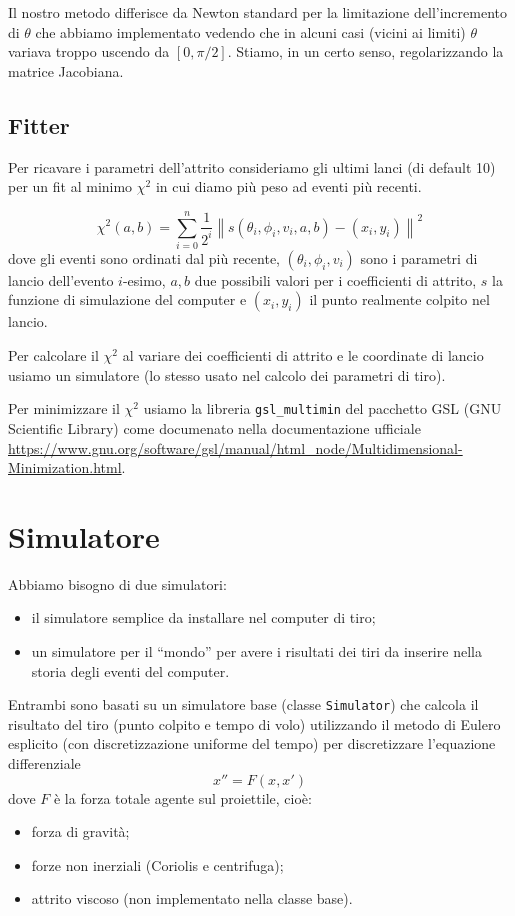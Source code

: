 \documentclass[a4paper,10pt]{article}
\newcommand{\pa}[1]{\left(#1\right)}
\newcommand{\bra}[1]{\left[#1\right]}
\newcommand{\norm}[1]{\left\|#1\right\|}
\begin{document}
Il nostro metodo differisce da Newton standard per la limitazione
dell'incremento di $\theta$ che abbiamo implementato vedendo che in
alcuni casi (vicini ai limiti) $\theta$ variava troppo uscendo da
$\bra{0,\pi/2}$. Stiamo, in un certo senso, regolarizzando la matrice
Jacobiana.

\subsection{Fitter}

Per ricavare i parametri dell'attrito consideriamo gli ultimi lanci
(di default 10) per un fit al minimo $\chi ^2$ in cui diamo pi\`u peso
ad eventi pi\`u recenti.

\[ \chi ^2 (a,b) = \sum _{i=0} ^ n \frac{1}{2^i} \norm{ s(\theta _i,
  \phi _i, v_i, a, b) - \pa{ x_i, y_i} } ^2 \]
dove gli eventi sono ordinati dal pi\`u recente,
$\pa{ \theta _i, \phi _i, v_i}$ sono i parametri di lancio dell'evento
$i$-esimo, $a,b$ due possibili valori per i coefficienti di attrito,
$s$ la funzione di simulazione del computer e $\pa{ x_i, y_i}$ il
punto realmente colpito nel lancio.

Per calcolare il $\chi ^2$ al variare dei coefficienti di attrito
e le coordinate di lancio usiamo un simulatore (lo stesso usato nel
calcolo dei parametri di tiro).

Per minimizzare il $\chi^2$ usiamo la libreria \verb+gsl_multimin+ del
pacchetto GSL (GNU Scientific Library) come documenato nella
documentazione ufficiale 
\url{https://www.gnu.org/software/gsl/manual/html_node/Multidimensional-Minimization.html}.


\section{Simulatore}

Abbiamo bisogno di due simulatori:
\begin{itemize}
\item il simulatore semplice da installare nel computer di tiro;
\item un simulatore per il ``mondo'' per avere i risultati dei tiri da
  inserire nella storia degli eventi del computer.
\end{itemize}

Entrambi sono basati su un simulatore base (classe \verb+Simulator+)
che calcola il risultato del tiro (punto colpito e tempo di volo)
utilizzando il metodo di Eulero esplicito (con discretizzazione
uniforme del tempo) per discretizzare l'equazione differenziale
\[ x'' = F(x,x') \]
dove $F$ \`e la forza totale agente sul proiettile, cio\`e:
\begin{itemize}
\item forza di gravit\`a;
\item forze non inerziali (Coriolis e centrifuga);
\item attrito viscoso (non implementato nella classe base).
\end{itemize}
\end{document}
